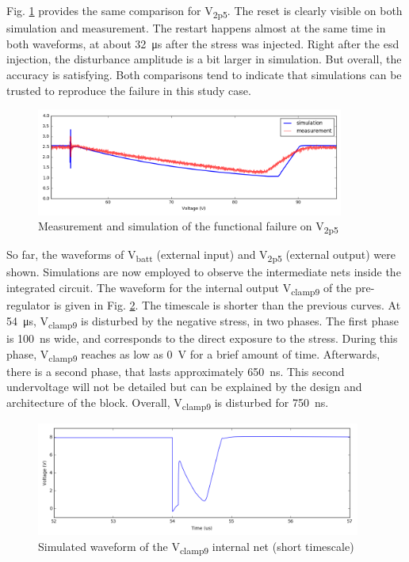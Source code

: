 Fig. \ref{fig:wvf-v2p5} provides the same comparison for V\textsubscript{2p5}.
The reset is clearly visible on both simulation and measurement.
The restart happens almost at the same time in both waveforms, at about \SI{32}{\micro\second} after the stress was injected.
Right after the \gls{esd} injection, the disturbance amplitude is a bit larger in simulation.
But overall, the accuracy is satisfying.
Both comparisons tend to indicate that simulations can be trusted to reproduce the failure in this study case.

\begin{figure}[!h]
  \centering
  \includegraphics[width=0.9\textwidth]{src/3/figures/v2p5.png}
  \caption{Measurement and simulation of the functional failure on V\textsubscript{2p5}}
  \label{fig:wvf-v2p5}
\end{figure}

So far, the waveforms of V\textsubscript{batt} (external input) and V\textsubscript{2p5} (external output) were shown.
Simulations are now employed to observe the intermediate nets inside the integrated circuit.
The waveform for the internal output V\textsubscript{clamp9} of the pre-regulator is given in Fig. \ref{fig:wvf-vclamp9}.
The timescale is shorter than the previous curves.
At \SI{54}{\micro\second},  V\textsubscript{clamp9} is disturbed by the negative stress, in two phases.
The first phase is \SI{100}{\nano\second} wide, and corresponds to the direct exposure to the stress.
During this phase, V\textsubscript{clamp9} reaches as low as \SI{0}{\volt} for a brief amount of time.
Afterwards, there is a second phase, that lasts approximately \SI{650}{\nano\second}.
This second undervoltage will not be detailed but can be explained by the design and architecture of the block.
Overall, V\textsubscript{clamp9} is disturbed for \SI{750}{\nano\second}.

\begin{figure}[!h]
  \centering
  \includegraphics[width=0.95\textwidth]{src/3/figures/vclamp9.png}
  \caption{Simulated waveform of the V\textsubscript{clamp9} internal net (short timescale)}
  \label{fig:wvf-vclamp9}
\end{figure}

